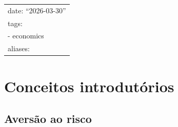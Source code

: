 \documentclass[12pt]{article}
\title{}
\author{}
\date{}
\numberwithin{equation}{section}
\theoremstyle{plain}
\theoremstyle{definition}
\theoremstyle{remark}
\begin{document}
\maketitle

\begin{longtable}[]{@{}l@{}}
\toprule\noalign{}
\endhead
\bottomrule\noalign{}
\endlastfoot
date: ``2026-03-30'' \\
tags: \\
- economics \\
aliases: \\
\end{longtable}

\hypertarget{conceitos-introdutuxf3rios}{%
\section{Conceitos introdutórios}\label{conceitos-introdutuxf3rios}}

\hypertarget{aversuxe3o-ao-risco}{%
\subsection{Aversão ao risco}\label{aversuxe3o-ao-risco}}
\end{document}

